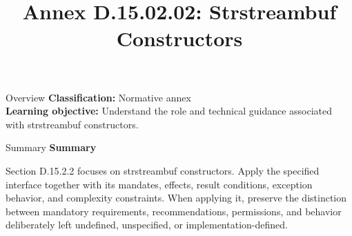 \documentclass[10pt,letterpaper]{article}
\title{Annex D.15.02.02: Strstreambuf Constructors}
\author{}
\date{}
\begin{document}
\maketitle
\begin{CornellOverviewBox}{Overview}
\textbf{Classification:} Normative annex\\[2pt]
\textbf{Learning objective:} Understand the role and technical guidance associated with strstreambuf constructors.
\end{CornellOverviewBox}\begin{CornellSummaryBox}{Summary}
{\sffamily\bfseries\color{Accent} Summary}\par\vspace{3pt}Section D.15.2.2 focuses on strstreambuf constructors. Apply the specified interface together with its mandates, effects, result conditions, exception behavior, and complexity constraints. When applying it, preserve the distinction between mandatory requirements, recommendations, permissions, and behavior deliberately left undefined, unspecified, or implementation-defined.
\end{CornellSummaryBox}
\end{document}
